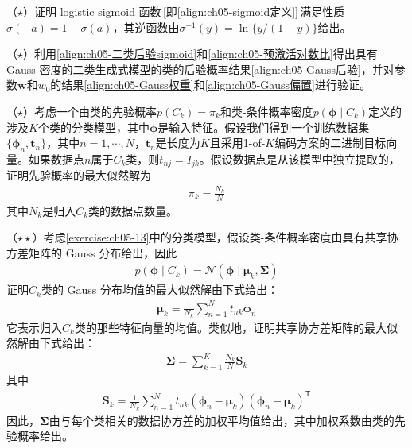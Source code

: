 \documentclass[../../main.tex]{subfiles}
\begin{document}
\begin{exercise}\label{exercise:ch05-11}
（$\star$）证明 logistic sigmoid 函数\,[即\eqref{align:ch05-sigmoid定义}]\,满足性质$\sigma(-a)=1-\sigma(a)$，其逆函数由$\sigma^{-1}(y)=\ln\{y/(1-y)\}$给出。
\end{exercise}

\begin{exercise}\label{exercise:ch05-12}
（$\star$）利用\eqref{align:ch05-二类后验sigmoid}和\eqref{align:ch05-预激活对数比}得出具有 Gauss 密度的二类生成式模型的类的后验概率结果\eqref{align:ch05-Gauss后验}，并对参数$\boldsymbol{w}$和$w_0$的结果\eqref{align:ch05-Gauss权重}和\eqref{align:ch05-Gauss偏置}进行验证。
\end{exercise}

\begin{exercise}\label{exercise:ch05-13}
（$\star$）考虑一个由类的先验概率$p(C_k)=\pi_k$和类-条件概率密度$p(\boldsymbol{\phi}\mid C_k)$定义的涉及$K$个类的分类模型，其中$\boldsymbol{\phi}$是输入特征。假设我们得到一个训练数据集$\{\boldsymbol{\phi}_n,\boldsymbol{t}_n\}$，其中$n=1,\cdots,N$，$\boldsymbol{t}_n$是长度为$K$且采用1-of-$K$编码方案的二进制目标向量。如果数据点$n$属于$C_k$类，则$t_{nj}=I_{jk}$。假设数据点是从该模型中独立提取的，证明先验概率的最大似然解为
\begin{align}
  \pi_k=\frac{N_k}{N}
  \label{align:ch05-习题先验ML}
\end{align}
其中$N_k$是归入$C_k$类的数据点数量。
\end{exercise}

\begin{exercise}\label{exercise:ch05-14}
（$\star\star$）考虑\cref{exercise:ch05-13}中的分类模型，假设类-条件概率密度由具有共享协方差矩阵的 Gauss 分布给出，因此
\begin{align}
  p(\boldsymbol{\phi}\mid C_k)=\mathcal{N}(\boldsymbol{\phi}\mid\boldsymbol{\mu}_k,\boldsymbol{\Sigma})
  \label{align:ch05-习题Gauss}
\end{align}
证明$C_k$类的 Gauss 分布均值的最大似然解由下式给出：
\begin{align}
  \boldsymbol{\mu}_k=\frac{1}{N_k}\sum_{n=1}^{N}t_{nk}\boldsymbol{\phi}_n
  \label{align:ch05-习题均值ML}
\end{align}
它表示归入$C_k$类的那些特征向量的均值。类似地，证明共享协方差矩阵的最大似然解由下式给出：
\begin{align}
  \boldsymbol{\Sigma}=\sum_{k=1}^{K}\frac{N_k}{N}\boldsymbol{S}_k
  \label{align:ch05-习题协方差ML}
\end{align}
其中
\begin{align}
  \boldsymbol{S}_k=\frac{1}{N_k}\sum_{n=1}^{N}t_{nk}(\boldsymbol{\phi}_n-\boldsymbol{\mu}_k)(\boldsymbol{\phi}_n-\boldsymbol{\mu}_k)^{\mathsf{T}}
  \label{align:ch05-习题类协方差}
\end{align}
因此，$\boldsymbol{\Sigma}$由与每个类相关的数据协方差的加权平均值给出，其中加权系数由类的先验概率给出。
\end{exercise}
\end{document}
